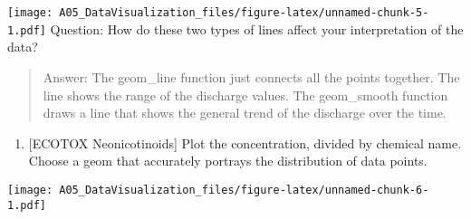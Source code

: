 \documentclass[]{article}
\newenvironment{Shaded}{\begin{snugshade}}{\end{snugshade}}
\newcommand{\KeywordTok}[1]{\textcolor[rgb]{0.13,0.29,0.53}{\textbf{#1}}}
\newcommand{\DataTypeTok}[1]{\textcolor[rgb]{0.13,0.29,0.53}{#1}}
\newcommand{\DecValTok}[1]{\textcolor[rgb]{0.00,0.00,0.81}{#1}}
\newcommand{\StringTok}[1]{\textcolor[rgb]{0.31,0.60,0.02}{#1}}
\newcommand{\CommentTok}[1]{\textcolor[rgb]{0.56,0.35,0.01}{\textit{#1}}}
\newcommand{\OperatorTok}[1]{\textcolor[rgb]{0.81,0.36,0.00}{\textbf{#1}}}
\newcommand{\NormalTok}[1]{#1}
\providecommand{\tightlist}{%
  \setlength{\itemsep}{0pt}\setlength{\parskip}{0pt}}
\begin{document}
\texttt{[image: A05\_DataVisualization\_files/figure-latex/unnamed-chunk-5-1.pdf]}
Question: How do these two types of lines affect your interpretation of
the data?

\begin{quote}
Answer: The geom\_line function just connects all the points together.
The line shows the range of the discharge values. The geom\_smooth
function draws a line that shows the general trend of the discharge over
the time.
\end{quote}

\begin{enumerate}
\def\labelenumi{\arabic{enumi}.}
\setcounter{enumi}{6}
\tightlist
\item
  {[}ECOTOX Neonicotinoids{]} Plot the concentration, divided by
  chemical name. Choose a geom that accurately portrays the distribution
  of data points.
\end{enumerate}

\begin{Shaded}
\end{Shaded}

\texttt{[image: A05\_DataVisualization\_files/figure-latex/unnamed-chunk-6-1.pdf]}
\end{document}
